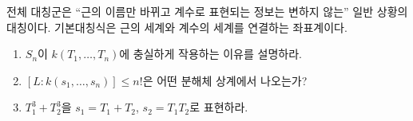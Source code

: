 \begin{keyidea}
전체 대칭군은 ``근의 이름만 바뀌고 계수로 표현되는 정보는 변하지 않는'' 일반 상황의 대칭이다. 기본대칭식은 근의 세계와 계수의 세계를 연결하는 좌표계이다.
\end{keyidea}

\begin{checkpoint}
\begin{enumerate}[label=(\alph*)]
  \item $S_n$이 $k(T_1,\dots,T_n)$에 충실하게 작용하는 이유를 설명하라.
  \item $[L:k(s_1,\dots,s_n)]\le n!$은 어떤 분해체 상계에서 나오는가?
  \item $T_1^3+T_2^3$을 $s_1=T_1+T_2$, $s_2=T_1T_2$로 표현하라.
\end{enumerate}
\end{checkpoint}

